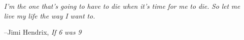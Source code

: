 \documentclass[fleqn,addpoints]{exam}
\begin{document}
\ifprintanswers

\fi

\ifprintanswers
\else
\vspace{7 cm}

{\em I'm the one that's going to have to die when it's time for me to die.  So let me live my life the way I want to.}

\vspace{.1 cm}
\hspace{1 cm} --Jimi Hendrix, {\em If 6 was 9}

\fi
\end{document}
